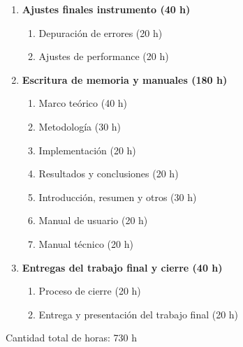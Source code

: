 \begin{enumerate}
	\item \textbf{Ajustes finales instrumento (40 h)}
	\begin{enumerate}
		\item Depuración de errores (20 h)
		\item Ajustes de performance (20 h)
	\end{enumerate}
	
	\item \textbf{Escritura de memoria y manuales (180 h)}
	\begin{enumerate}
		\item Marco teórico (40 h)
		\item Metodología (30 h)
		\item Implementación (20 h)
		\item Resultados y conclusiones (20 h)
		\item Introducción, resumen y otros (30 h)
		\item Manual de usuario (20 h)
		\item Manual técnico (20 h)
	\end{enumerate}
	
	\item \textbf{Entregas del trabajo final y cierre (40 h)}
	\begin{enumerate}
		\item Proceso de cierre (20 h)
		\item Entrega y presentación del trabajo final (20 h)
	\end{enumerate}
\end{enumerate}


Cantidad total de horas: 730 h


